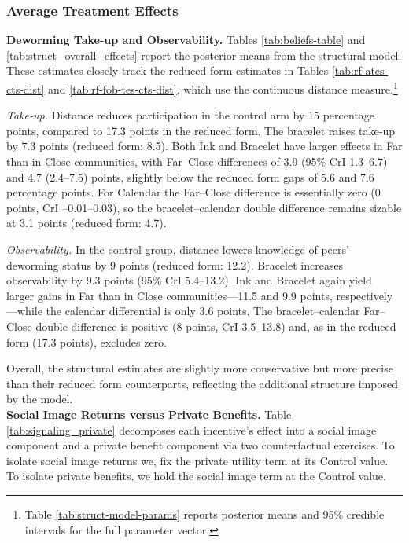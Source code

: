 \documentclass[12pt,a4paper]{article}
\begin{document}
\subsubsection{Average Treatment Effects}

\textbf{Deworming Take-up and Observability.}
Tables \ref{tab:beliefs-table} and \ref{tab:struct_overall_effects} report the posterior means from the structural model. These estimates closely track the reduced form estimates in Tables \ref{tab:rf-ates-cts-dist} and \ref{tab:rf-fob-tes-cts-dist}, which use the continuous distance measure.\footnote{Table \ref{tab:struct-model-params} reports posterior means and 95\% credible intervals for the full parameter vector.} 

\emph{Take‑up.}  
Distance reduces participation in the control arm by 15 percentage points, compared to 17.3 points in the reduced form. The bracelet raises take‑up by 7.3 points (reduced form: 8.5). Both Ink and Bracelet have larger effects in Far than in Close communities, with Far–Close differences of 3.9 (95\% CrI 1.3–6.7) and 4.7 (2.4–7.5) points, slightly below the reduced form gaps of 5.6 and 7.6 percentage points. For Calendar the Far–Close difference is essentially zero (0 points, CrI –0.01–0.03), so the bracelet–calendar double difference remains sizable at 3.1 points (reduced form: 4.7).

\emph{Observability.}  
In the control group, distance lowers knowledge of peers’ deworming status by 9 points (reduced form: 12.2). Bracelet increases observability by 9.3 points (95\% CrI 5.4–13.2).  
Ink and Bracelet again yield larger gains in Far than in Close communities—11.5 and 9.9 points, respectively—while the calendar differential is only 3.6 points.  
The bracelet–calendar Far–Close double difference is positive (8 points, CrI 3.5–13.8) and, as in the reduced form (17.3 points), excludes zero.

Overall, the structural estimates are slightly more conservative but more precise than their reduced form counterparts,  reflecting the additional structure imposed by the model. \\ 

\textbf{Social Image Returns versus Private Benefits.}  
Table \ref{tab:signaling_private} decomposes each incentive’s effect into a social image component and a private benefit component via two counterfactual exercises.  
To isolate social image returns we, fix the private utility term at its Control value. To isolate private benefits, we hold the social image term at the Control value.
\end{document}
